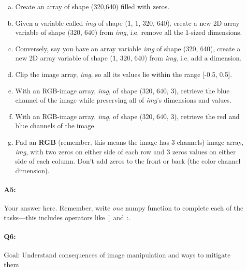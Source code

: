 \begin{enumerate}[a.]
    \item Create an array of shape (320,640) filled with zeros.
    \item Given a variable called \emph{img} of shape (1, 1, 320, 640), create a new 2D array variable of shape (320, 640) from \emph{img}, i.e. remove all the 1-sized dimensions. 
    \item Conversely, say you have an array variable \emph{img} of shape (320, 640), create a new 2D array variable of shape (1, 320, 640) from \emph{img}, i.e. add a dimension. 
    \item Clip the image array, \emph{img}, so all its values lie within the range [-0.5, 0.5].
    \item With an RGB-image array, \emph{img}, of shape (320, 640, 3), retrieve the blue channel of the image while preserving all of \emph{img}'s dimensions and values. 
    \item With an RGB-image array, \emph{img}, of shape (320, 640, 3), retrieve the red and blue channels of the image. 
    \item Pad an \textbf{RGB} (remember, this means the image has 3 channels) image array, \emph{img}, with two zeros on either side of each row and 3 zeros values on either side of each column. Don't add zeros to the front or back (the color channel dimension).
\end{enumerate}


\pagebreak
\paragraph{A5:} Your answer here. Remember, write \emph{one} numpy function to complete each of the tasks---this includes operators like [] and :.



\pagebreak
\paragraph{Q6:} 
Goal: Understand consequences of image manipulation and ways to mitigate them

